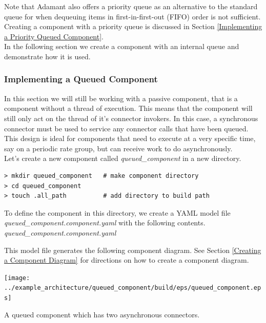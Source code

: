 Note that Adamant also offers a priority queue as an alternative to the standard queue for when dequeuing items in first-in-first-out (FIFO) order is not sufficient. Creating a component with a priority queue is discussed in Section \ref{Implementing a Priority Queued Component}. \\

In the following section we create a component with an internal queue and demonstrate how it is used.

\subsubsection{Implementing a Queued Component} \label{Implementing a Queued Component}

In this section we will still be working with a passive component, that is a component without a thread of execution. This means that the component will still only act on the thread of it's connector invokers. In this case, a synchronous connector must be used to service any connector calls that have been queued. This design is ideal for components that need to execute at a very specific time, say on a periodic rate group, but can receive work to do asynchronously. \\

Let's create a new component called \textit{queued\_component} in a new directory.

\vspace{5mm} %
\begin{verbatim}
> mkdir queued_component   # make component directory
> cd queued_component 
> touch .all_path          # add directory to build path
\end{verbatim}
\vspace{5mm} %

To define the component in this directory, we create a YAML model file \textit{queued\_component.component.yaml} with the following contents. \\

\textit{queued\_component.component.yaml}

This model file generates the following component diagram. See Section \ref{Creating a Component Diagram} for directions on how to create a component diagram.

\vspace{5mm} %
\texttt{[image: ../example\_architecture/queued\_component/build/eps/queued\_component.eps]}
\caption{A queued component which has two asynchronous connectors.}
\vspace{5mm} %

